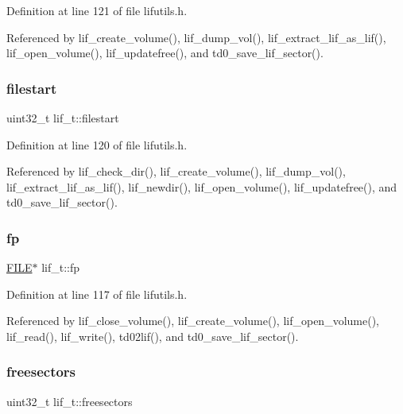 Definition at line 121 of file lifutils.\+h.



Referenced by lif\+\_\+create\+\_\+volume(), lif\+\_\+dump\+\_\+vol(), lif\+\_\+extract\+\_\+lif\+\_\+as\+\_\+lif(), lif\+\_\+open\+\_\+volume(), lif\+\_\+updatefree(), and td0\+\_\+save\+\_\+lif\+\_\+sector().

\mbox{\label{structlif__t_a3c1bcc66b694d07ebc304ef7cb66b4ef}} 
\subsubsection{\texorpdfstring{filestart}{filestart}}
{\footnotesize\ttfamily uint32\+\_\+t lif\+\_\+t\+::filestart}



Definition at line 120 of file lifutils.\+h.



Referenced by lif\+\_\+check\+\_\+dir(), lif\+\_\+create\+\_\+volume(), lif\+\_\+dump\+\_\+vol(), lif\+\_\+extract\+\_\+lif\+\_\+as\+\_\+lif(), lif\+\_\+newdir(), lif\+\_\+open\+\_\+volume(), lif\+\_\+updatefree(), and td0\+\_\+save\+\_\+lif\+\_\+sector().

\mbox{\label{structlif__t_ad679ba16ca21371a649981a4cca9e64c}} 
\subsubsection{\texorpdfstring{fp}{fp}}
{\footnotesize\ttfamily \hyperlink{posix_8h_aed4dabeb9f7c518ded42f930a04abce8}{F\+I\+LE}$\ast$ lif\+\_\+t\+::fp}



Definition at line 117 of file lifutils.\+h.



Referenced by lif\+\_\+close\+\_\+volume(), lif\+\_\+create\+\_\+volume(), lif\+\_\+open\+\_\+volume(), lif\+\_\+read(), lif\+\_\+write(), td02lif(), and td0\+\_\+save\+\_\+lif\+\_\+sector().

\mbox{\label{structlif__t_a1fc11461eb5643d84e229772f7623152}} 
\subsubsection{\texorpdfstring{freesectors}{freesectors}}
{\footnotesize\ttfamily uint32\+\_\+t lif\+\_\+t\+::freesectors}



